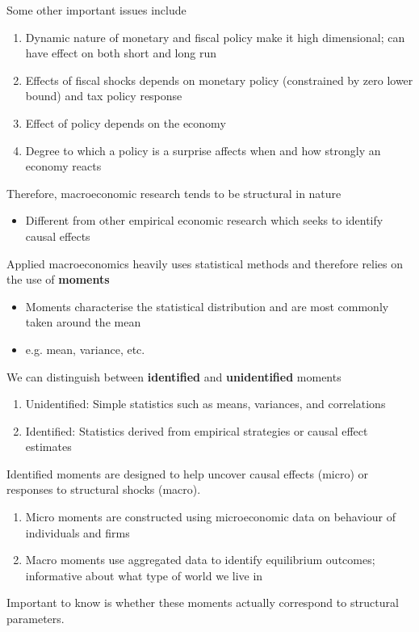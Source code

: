 \documentclass{beamer}
\begin{document}
\begin{frame}
  Some other important issues include
  \medskip
  \begin{enumerate}
   \item Dynamic nature of monetary and fiscal policy make it high dimensional; can have effect on both short and long run
   \item Effects of fiscal shocks depends on monetary policy (constrained by zero lower bound) and tax policy response
   \item Effect of policy depends on the economy
   \item Degree to which a policy is a surprise affects when and how strongly an economy reacts  
 \end{enumerate}
 \medskip
 Therefore, macroeconomic research tends to be structural in nature  
 \begin{itemize}
   \item Different from other empirical economic research which seeks to identify causal effects
 \end{itemize} 
\end{frame}

\begin{frame}
  Applied macroeconomics heavily uses statistical methods and therefore relies on the use of \textbf{moments}  
  \begin{itemize}
    \item Moments characterise the statistical distribution and are most commonly taken around the mean
    \item e.g. mean, variance, etc. 
  \end{itemize}
  \medskip
  We can distinguish between \textbf{identified} and \textbf{unidentified} moments  
  \begin{enumerate}
    \item Unidentified: Simple statistics such as means, variances, and correlations
    \item Identified: Statistics derived from empirical strategies or causal effect estimates 
  \end{enumerate}
\end{frame}

\begin{frame}
 Identified moments are designed to help uncover causal effects (micro) or responses to structural shocks (macro).
 \medskip
 \begin{enumerate}
   \item Micro moments are constructed using microeconomic data on behaviour of individuals and firms
   \item Macro moments use aggregated data to identify equilibrium outcomes; informative about what type of world we live in 
  \end{enumerate} 
  \medskip
  Important to know is whether these moments actually correspond to structural parameters.
\end{frame}
\end{document}
